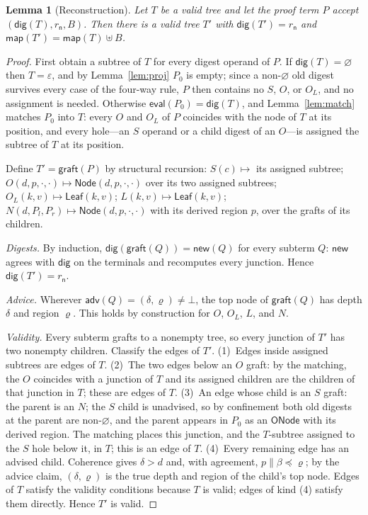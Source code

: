 \documentclass[11pt]{article}
\newtheorem{lemma}{Lemma}
\begin{document}
\begin{lemma}[Reconstruction]
\label{lem:graft}
Let $T$ be a valid tree and let the proof term $P$ accept $(\mathsf{dig}(T), r_{\mathsf n}, B)$. Then there is a valid tree $T'$ with $\mathsf{dig}(T') = r_{\mathsf n}$ and $\mathsf{map}(T') = \mathsf{map}(T) \uplus B$.
\end{lemma}
\begin{proof}
First obtain a subtree of $T$ for every digest operand of $P$. If $\mathsf{dig}(T) = \varnothing$ then $T = \varepsilon$, and by Lemma~\ref{lem:proj} $P_0$ is empty; since a non-$\varnothing$ old digest survives every case of the four-way rule, $P$ then contains no $S$, $O$, or $O_L$, and no assignment is needed. Otherwise $\mathsf{eval}(P_0) = \mathsf{dig}(T)$, and Lemma~\ref{lem:match} matches $P_0$ into $T$: every $O$ and $O_L$ of $P$ coincides with the node of $T$ at its position, and every hole---an $S$ operand or a child digest of an $O$---is assigned the subtree of $T$ at its position.

Define $T' = \mathsf{graft}(P)$ by structural recursion: $S(c) \mapsto$ its assigned subtree; $O(d,p,\cdot,\cdot) \mapsto \mathsf{Node}(d,p,\cdot,\cdot)$ over its two assigned subtrees; $O_L(k,v) \mapsto \mathsf{Leaf}(k,v)$; $L(k,v) \mapsto \mathsf{Leaf}(k,v)$; $N(d,P_l,P_r) \mapsto \mathsf{Node}(d,p,\cdot,\cdot)$ with its derived region $p$, over the grafts of its children.

\emph{Digests.} By induction, $\mathsf{dig}(\mathsf{graft}(Q)) = \mathsf{new}(Q)$ for every subterm $Q$: $\mathsf{new}$ agrees with $\mathsf{dig}$ on the terminals and recomputes every junction. Hence $\mathsf{dig}(T') = r_{\mathsf n}$.

\emph{Advice.} Wherever $\mathsf{adv}(Q) = (\delta, \varrho) \neq \bot$, the top node of $\mathsf{graft}(Q)$ has depth $\delta$ and region $\varrho$. This holds by construction for $O$, $O_L$, $L$, and $N$.

\emph{Validity.} Every subterm grafts to a nonempty tree, so every junction of $T'$ has two nonempty children. Classify the edges of $T'$.
(1)~Edges inside assigned subtrees are edges of $T$.
(2)~The two edges below an $O$ graft: by the matching, the $O$ coincides with a junction of $T$ and its assigned children are the children of that junction in $T$; these are edges of $T$.
(3)~An edge whose child is an $S$ graft: the parent is an $N$; the $S$ child is unadvised, so by confinement both old digests at the parent are non-$\varnothing$, and the parent appears in $P_0$ as an $\mathsf{ONode}$ with its derived region. The matching places this junction, and the $T$-subtree assigned to the $S$ hole below it, in $T$; this is an edge of $T$.
(4)~Every remaining edge has an advised child. Coherence gives $\delta > d$ and, with agreement, $p\|\beta \preceq \varrho$; by the advice claim, $(\delta, \varrho)$ is the true depth and region of the child's top node. Edges of $T$ satisfy the validity conditions because $T$ is valid; edges of kind (4) satisfy them directly. Hence $T'$ is valid.


\end{proof}
\end{document}
